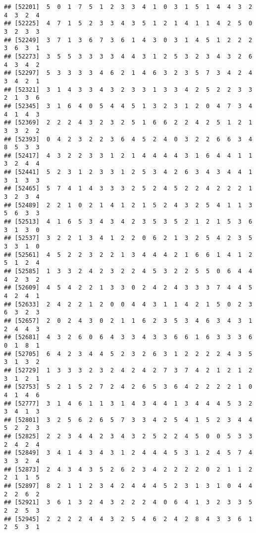 \documentclass[
]{article}
\begin{document}
\begin{verbatim}
## [52201]  5  0  1  7  5  1  2  3  3  4  1  0  3  1  5  1  4  4  3  2  4  3  2  4
## [52225]  4  7  1  5  2  3  3  4  3  5  1  2  1  4  1  1  4  2  5  0  3  2  3  3
## [52249]  3  7  1  3  6  7  3  6  1  4  3  0  3  1  4  5  1  2  2  2  3  6  3  1
## [52273]  3  5  5  3  3  3  3  4  4  3  1  2  5  3  2  3  4  3  2  6  4  3  4  2
## [52297]  5  3  3  3  3  4  6  2  1  4  6  3  2  3  5  7  3  4  2  4  3  4  2  1
## [52321]  3  1  4  3  3  4  3  2  3  3  1  3  3  4  2  5  2  2  3  3  2  1  3  6
## [52345]  3  1  6  4  0  5  4  4  5  1  3  2  3  1  2  0  4  7  3  4  4  1  4  3
## [52369]  2  2  2  4  3  2  3  2  5  1  6  6  2  2  4  2  5  1  2  1  3  3  2  2
## [52393]  0  4  2  3  2  2  3  6  4  5  2  4  0  3  2  2  6  6  3  4  8  5  3  3
## [52417]  4  3  2  2  3  3  1  2  1  4  4  4  4  3  1  6  4  4  1  1  3  2  4  4
## [52441]  5  2  3  1  2  3  3  1  2  5  3  4  2  6  3  4  3  4  4  1  3  1  3  3
## [52465]  5  7  4  1  4  3  3  3  2  5  2  4  5  2  2  4  2  2  2  1  3  2  3  4
## [52489]  2  2  1  0  2  1  4  1  2  1  5  2  4  3  2  5  4  1  1  3  5  6  3  3
## [52513]  4  1  6  5  3  4  3  4  2  3  5  3  5  2  1  2  1  5  3  6  3  1  3  0
## [52537]  3  2  2  1  3  4  1  2  2  0  6  2  1  3  2  5  4  2  3  5  3  3  1  0
## [52561]  4  5  2  2  3  2  2  1  3  4  4  4  2  1  6  6  1  4  1  2  5  1  2  4
## [52585]  1  3  3  2  4  2  3  2  2  4  5  3  2  2  5  5  0  6  4  4  4  2  3  2
## [52609]  4  5  4  2  2  1  3  3  0  2  4  2  4  3  3  3  7  4  4  5  4  2  4  1
## [52633]  2  4  2  2  1  2  0  0  4  4  3  1  1  4  2  1  5  0  2  3  6  3  2  3
## [52657]  2  0  2  4  3  0  2  1  1  6  2  3  5  3  4  6  3  4  3  1  2  4  4  3
## [52681]  4  3  2  6  0  6  4  3  3  4  3  3  6  6  1  6  3  3  3  6  0  1  8  1
## [52705]  6  4  2  3  4  4  5  2  3  2  6  3  1  2  2  2  2  4  3  5  3  1  3  2
## [52729]  1  3  3  3  2  3  2  4  2  4  2  7  3  7  4  2  1  2  1  2  3  1  2  1
## [52753]  5  2  1  5  2  7  2  4  2  6  5  3  6  4  2  2  2  2  1  0  4  1  4  6
## [52777]  3  1  4  6  1  1  3  1  4  3  4  4  1  3  4  4  4  5  3  2  3  4  1  3
## [52801]  3  2  5  6  2  6  5  7  3  3  4  2  5  4  1  5  2  3  4  4  5  2  2  3
## [52825]  2  2  3  4  4  2  3  4  3  2  5  2  2  4  5  0  0  5  3  3  2  4  2  4
## [52849]  3  4  1  4  3  4  3  1  2  4  4  4  5  3  1  2  4  5  7  4  3  3  2  4
## [52873]  2  4  3  4  3  5  2  6  2  3  4  2  2  2  2  0  2  1  1  2  2  1  1  5
## [52897]  8  2  1  1  2  3  4  2  4  4  4  5  2  3  1  3  1  0  4  4  2  2  6  2
## [52921]  3  6  1  3  2  4  3  2  2  2  4  0  6  4  1  3  2  3  3  5  2  2  5  3
## [52945]  2  2  2  2  4  4  3  2  5  4  6  2  4  2  8  4  3  3  6  1  2  5  3  1

\end{verbatim}
\end{document}
